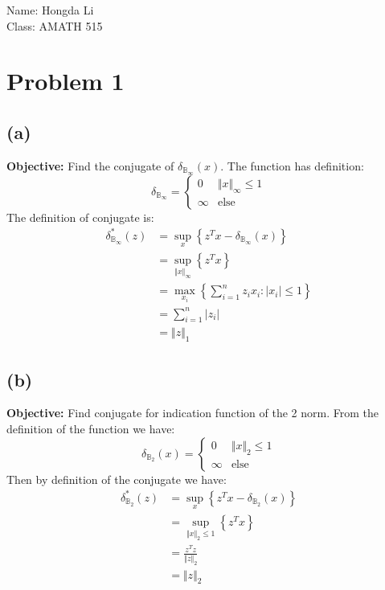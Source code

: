 \documentclass[]{article}
\begin{document}
\hspace{-1.8em}
Name: Hongda Li\\
Class: AMATH 515
\section*{Problem 1}
    \subsection*{(a)}
        \textbf{Objective: }Find the conjugate of $\delta_{\mathbb{B}_\infty}(x)$. The function has definition: 
        $$
        \delta_{\mathbb{B}_\infty} = 
        \begin{cases}
            0 & \Vert x\Vert_\infty \le 1
            \\
            \infty & \text{else}
        \end{cases}
        $$
        The definition of conjugate is: 
        \begin{align*}\tag{1a1}\label{eqn:1a1}
            \delta_{\mathbb{B}_\infty}^*(z) 
            &= 
            \sup_x \left\lbrace
                z^Tx - \delta_{\mathbb{B}_\infty}(x)
            \right\rbrace
            \\
            &= \sup_{\Vert x\Vert_\infty} \left\lbrace
            z^Tx
            \right\rbrace
            \\
            &= \max_{x_i}\left\lbrace
                \sum_{i = 1}^n z_i x_i: |x_i|\le 1
            \right\rbrace
            \\
            &= \sum_{i = 1}^n |z_i|
            \\
            &= \Vert z\Vert_1
        \end{align*}

    \subsection*{(b)}
        \textbf{Objective: }Find conjugate for indication function of the 2 norm. 
        From the definition of the function we have: 
        $$
        \delta_{\mathbb{B}_2}(x) = 
        \begin{cases}
            0 & \Vert x\Vert_2 \le 1 
            \\
            \infty & \text{else}
        \end{cases}
        $$
        Then by definition of the conjugate we have: 
        \begin{align*}\tag{1b1}\label{eqn:1b1}
            \delta_{\mathbb{B}_2}^*(z) &= 
            \sup_x \left\lbrace
                z^Tx - \delta_{\mathbb{B}_2}(x)
            \right\rbrace
            \\
            &= 
            \sup_{\Vert x\Vert_2 \le 1} \left\lbrace 
            z^Tx
            \right\rbrace
            \\
            &= \frac{z^Tz}{\Vert z\Vert_2}
            \\
            &= \Vert z\Vert_2
        \end{align*}
\end{document}

